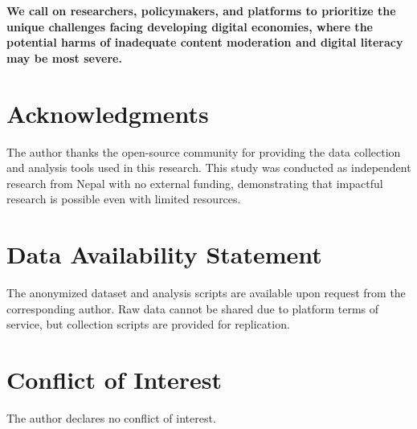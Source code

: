 \documentclass[11pt,a4paper]{article}
\begin{document}
\textbf{We call on researchers, policymakers, and platforms to prioritize the unique challenges facing developing digital economies, where the potential harms of inadequate content moderation and digital literacy may be most severe.}

\section*{Acknowledgments}

The author thanks the open-source community for providing the data collection and analysis tools used in this research. This study was conducted as independent research from Nepal with no external funding, demonstrating that impactful research is possible even with limited resources.

\section*{Data Availability Statement}

The anonymized dataset and analysis scripts are available upon request from the corresponding author. Raw data cannot be shared due to platform terms of service, but collection scripts are provided for replication.

\section*{Conflict of Interest}

The author declares no conflict of interest.

\newpage



\newpage
\appendix
\end{document}
